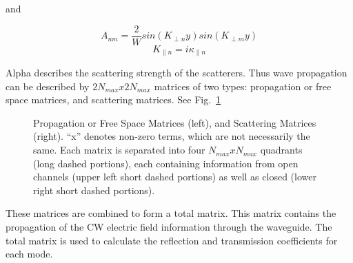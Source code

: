 and

\begin{equation}
A_{nm}=\frac{2}{W}sin(K_{\perp n}y)sin(K_{\perp m}y)
\end{equation}
\begin{equation}
K_{\parallel n}=i\kappa_{\parallel n}
\end{equation}

Alpha describes the scattering strength of the scatterers. Thus wave
propagation can be described by $2 N_{max} x 2 N_{max}$ matrices of two types:
propagation or free space matrices, and scattering matrices. 
See Fig.~\ref{fig:tomsmatrices}

\begin{figure}
\vskip -0.5cm
\centerline{
\quad \quad \quad \quad
{}}
\vskip -0.5cm
\caption{Propagation or Free Space Matrices (left),
and Scattering Matrices (right). ``x'' denotes non-zero terms, which are not necessarily the same. 
Each matrix is separated into four $N_{max} x N_{max}$ quadrants 
(long dashed portions), each containing information from open channels
(upper left short dashed portions) as well as closed (lower right short
dashed portions). }
\label{fig:tomsmatrices}
\end{figure}

These matrices are combined to form a total matrix.
This matrix contains the propagation of the CW electric field information through the 
waveguide. The total matrix is used to calculate the reflection and
transmission coefficients for each mode.

